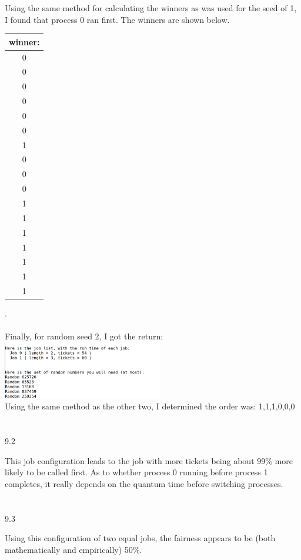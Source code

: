 \documentclass[12pt, a4paper]{article}
\begin{document}
Using the same method for calculating the winners as was used for the seed of 1, I found that process 0 ran first. The winners are shown below.
 \begin{center}
\begin{tabular}{ |c|} 
 \hline
winner: \\ 
 \hline
0 \\ 
0 \\
0\\
0\\ 
0\\
0\\
1 \\
0\\
0\\
0\\
1\\
1\\
1\\
1\\
1\\
1\\
1\\
 \hline
\end{tabular}
\end{center}
.\\ \\

Finally, for random seed 2, I got the return: \\
\includegraphics[width=7cm]{hw2_9_1_c.png} \\

Using the same method as the other two, I determined the order was: 
1,1,1,0,0,0\\ \\ \\

9.2

This job configuration leads to the job with more tickets being about 99\% more likely to be called first. As to whether process 0 running before process 1 completes, it really depends on the quantum time before switching processes.  \\ \\ \\

9.3

Using this configuration of two equal jobs, the fairness appears to be (both mathematically and empirically) 50\%. \\ \\ \\
\end{document}
